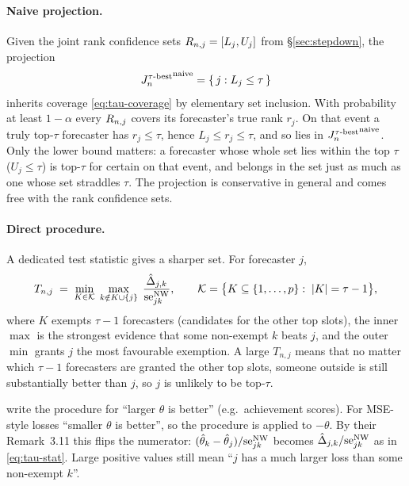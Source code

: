 \paragraph{Naive projection.} Given the joint rank confidence sets
$R_{n,j}=[L_j,U_j]$ from \S\ref{sec:stepdown}, the projection
\begin{equation}
  {J^{\tau\text{-best}}_n}^{\text{naive}}=\{\, j : L_j\le\tau\,\}
\end{equation}
inherits coverage \eqref{eq:tau-coverage} by elementary set inclusion. With probability
at least $1-\alpha$ every $R_{n,j}$ covers its forecaster's true rank $r_j$. On that
event a truly top-$\tau$ forecaster has $r_j\le\tau$, hence $L_j\le r_j\le\tau$, and so
lies in ${J^{\tau\text{-best}}_n}^{\text{naive}}$. Only the lower bound matters: a forecaster whose
whole set lies within the top $\tau$ ($U_j\le\tau$) is top-$\tau$ for certain on that
event, and belongs in the set just as much as one whose set straddles $\tau$. The
projection is conservative in general and comes free with the rank confidence sets.

\paragraph{Direct procedure.} A dedicated test statistic gives a sharper set. For
forecaster $j$,
\begin{equation}
  T_{n,j}\;=\;\min_{K\in\mathcal{K}}\;\max_{k\notin K\cup\{j\}}\;
  \frac{\hat{\Delta}_{j,k}}{\mathrm{se}^{\mathrm{NW}}_{jk}},
  \qquad
  \mathcal{K}=\big\{K\subseteq\{1,\dots,p\}:\;|K|=\tau-1\big\},
  \label{eq:tau-stat}
\end{equation}
where $K$ exempts $\tau-1$ forecasters (candidates for the other top slots), the inner
$\max$ is the strongest evidence that some non-exempt $k$ beats $j$, and the outer
$\min$ grants $j$ the most favourable exemption. A large $T_{n,j}$ means that no matter
which $\tau-1$ forecasters are granted the other top slots, someone outside is still
substantially better than $j$, so $j$ is unlikely to be top-$\tau$.

\begin{remark}
\citet{mogstad2024} write the procedure for ``larger $\theta$ is better'' (e.g.\
achievement scores). For MSE-style losses ``smaller $\theta$ is better'', so the
procedure is applied to $-\theta$. By their Remark~3.11 this flips the numerator:
$(\hat\theta_k-\hat\theta_j)/\mathrm{se}^{\mathrm{NW}}_{jk}$ becomes
$\hat{\Delta}_{j,k}/\mathrm{se}^{\mathrm{NW}}_{jk}$ as in \eqref{eq:tau-stat}. Large positive values still
mean ``$j$ has a much larger loss than some non-exempt $k$''.
\end{remark}


